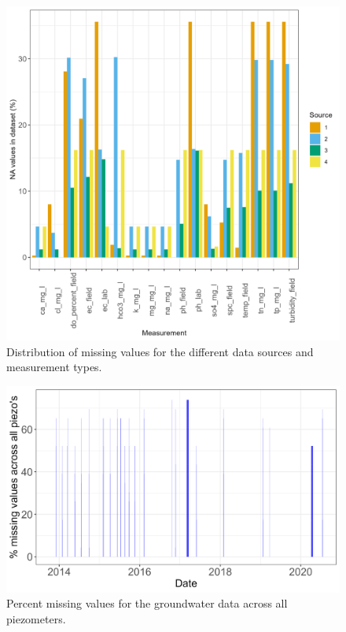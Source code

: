 \documentclass[, manuscript]{copernicus}
\begin{document}
\begin{figure}
\includegraphics[width=0.9\linewidth]{Figures/na_count} \caption{Distribution of missing values for the different data sources and measurement types.}\label{fig:na-plot}
\end{figure}

\begin{figure}
\includegraphics[width=0.9\linewidth]{Figures/na_GW} \caption{Percent missing values for the groundwater data across all piezometers.}\label{fig:gw-na-plot}
\end{figure}
\end{document}
